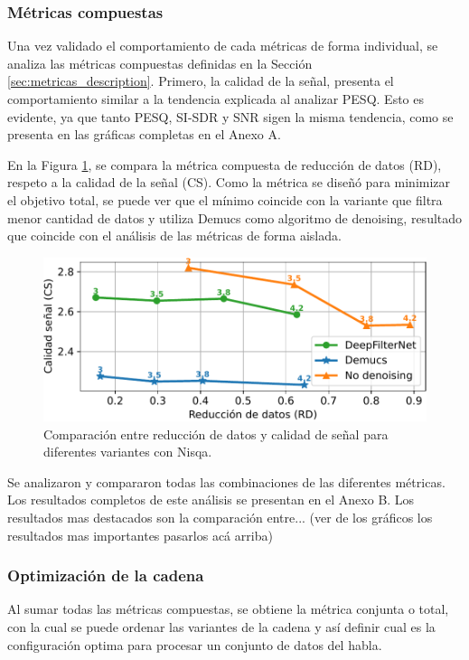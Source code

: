 \subsubsection{Métricas compuestas}
Una vez validado el comportamiento de cada métricas de forma individual, se analiza las métricas compuestas definidas en la Sección \ref{sec:metricas_description}. Primero, la calidad de la señal, presenta el comportamiento similar a la tendencia explicada al analizar PESQ. Esto es evidente, ya que tanto PESQ, SI-SDR y SNR sigen la misma tendencia, como se presenta en las gráficas completas en el Anexo A.

En la Figura \ref{fig:RD_vs_CS}, se compara la métrica compuesta de reducción de datos (RD), respeto a la calidad de la señal (CS). Como la métrica se diseñó para minimizar el objetivo total, se puede ver que el mínimo coincide con la variante que filtra menor cantidad de datos y utiliza Demucs como algoritmo de denoising, resultado que coincide con el análisis de las métricas de forma aislada.

\begin{figure}[h]
  \centering
  \centerline{\includegraphics[width=12cm]{Figuras/Pipeline/RD vs CS (nisqa).pdf}}
  \caption{Comparación entre reducción de datos y calidad de señal para diferentes variantes con Nisqa.}
    \label{fig:RD_vs_CS}
\end{figure}

Se analizaron y compararon todas las combinaciones de las diferentes métricas. Los resultados completos de este análisis se presentan en el Anexo B. Los resultados mas destacados son la comparación entre...
(ver de los gráficos los resultados mas importantes pasarlos acá arriba)

\subsubsection{Optimización de la cadena}
Al sumar todas las métricas compuestas, se obtiene la métrica conjunta o total, con la cual se puede ordenar las variantes de la cadena y así definir cual es la configuración optima para procesar un conjunto de datos del habla.


